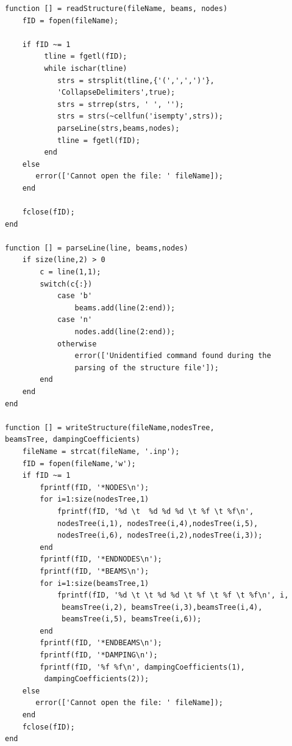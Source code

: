\documentclass[10pt,a4paper,final]{report}
\begin{document}
\begin{lstlisting}
function [] = readStructure(fileName, beams, nodes)
    fID = fopen(fileName);
    
    if fID ~= 1
         tline = fgetl(fID);
         while ischar(tline)
            strs = strsplit(tline,{'(',',',')'},
            'CollapseDelimiters',true);
            strs = strrep(strs, ' ', '');
            strs = strs(~cellfun('isempty',strs));
            parseLine(strs,beams,nodes);
            tline = fgetl(fID);
         end
    else
       error(['Cannot open the file: ' fileName]); 
    end
    
    fclose(fID);
end

function [] = parseLine(line, beams,nodes)
    if size(line,2) > 0
        c = line(1,1);
        switch(c{:})
            case 'b'
                beams.add(line(2:end));
            case 'n'
                nodes.add(line(2:end));
            otherwise
                error(['Unidentified command found during the 
                parsing of the structure file']);
        end
    end
end

function [] = writeStructure(fileName,nodesTree, 
beamsTree, dampingCoefficients)
    fileName = strcat(fileName, '.inp');
    fID = fopen(fileName,'w');
    if fID ~= 1
        fprintf(fID, '*NODES\n');
        for i=1:size(nodesTree,1)
            fprintf(fID, '%d \t  %d %d %d \t %f \t %f\n', 
            nodesTree(i,1), nodesTree(i,4),nodesTree(i,5),
            nodesTree(i,6), nodesTree(i,2),nodesTree(i,3));
        end
        fprintf(fID, '*ENDNODES\n');
        fprintf(fID, '*BEAMS\n');
        for i=1:size(beamsTree,1)
            fprintf(fID, '%d \t \t %d %d \t %f \t %f \t %f\n', i,
             beamsTree(i,2), beamsTree(i,3),beamsTree(i,4),
             beamsTree(i,5), beamsTree(i,6));
        end
        fprintf(fID, '*ENDBEAMS\n');
        fprintf(fID, '*DAMPING\n');
        fprintf(fID, '%f %f\n', dampingCoefficients(1),
         dampingCoefficients(2));
    else
       error(['Cannot open the file: ' fileName]);
    end
    fclose(fID);
end


\end{lstlisting}
\newpage
\end{document}
